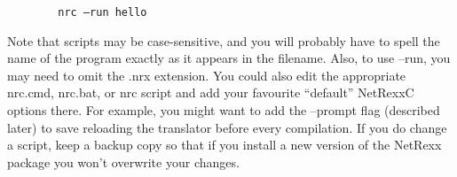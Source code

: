 \begin{enumerate}
  \begin{verbatim}
        nrc –run hello
\end{verbatim}
Note that scripts may be case-sensitive, and you will probably have to spell the name of the program exactly as it appears in the filename. Also, to use –run, you may need to omit the .nrx extension. 
You could also edit the appropriate nrc.cmd, nrc.bat, or nrc script and add your favourite “default” NetRexxC options there. For example, you might want to add the –prompt flag (described later) to save reloading the translator before every compilation. If you do change a script, keep a backup copy so that if you install a new version of the NetRexx package you won’t overwrite your changes. 
\end{enumerate}